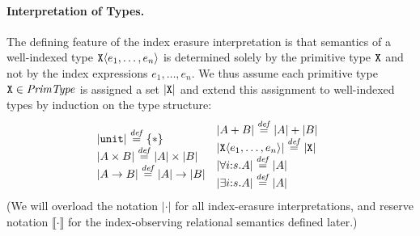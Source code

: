 
\paragraph{Interpretation of Types.}

The defining feature of the index erasure interpretation is that 
semantics of a well-indexed type $\textup{\texttt{X}}\langle e_1,\ldots,e_n \rangle$ is
determined solely by the primitive type $\textup{\texttt{X}}$ and not by the
index expressions $e_1,\ldots,e_n$. %
We thus assume each
primitive type $\textup{\texttt{X}} \in \mathit{PrimType}$ is assigned a set
$\left| \textup{\texttt{X}}\right|$ and %
extend this assignment to %
well-indexed types by induction on the type structure:
\begin{displaymath}
  \begin{array}{@{}c@{\hspace{0em}}c@{}}
    \begin{array}{@{}l}
      \tySem{\tyUnit} \isDefinedAs \{*\} \\
      \tySem{A \tyProduct B} \isDefinedAs \tySem{A} \times \tySem{B} \\
      \tySem{A \tyArr B} \isDefinedAs \tySem{A} \to \tySem{B} \\
    \end{array}
    &
    \begin{array}{l}
      \tySem{A + B} \isDefinedAs \tySem{A} + \tySem{B} \\
      \tySem{\tyPrim{X}{e_1,\ldots,e_n}} \isDefinedAs \tyPrimSem{\tyPrimNm{X}} \\
      \tySem{\forall i\mathord:s. A} \isDefinedAs \tySem{A} \\
      \tySem{\exists i\mathord:s. A} \isDefinedAs \tySem{A}
    \end{array}
  \end{array}
\end{displaymath}
(We will overload the
notation $\left|\cdot\right|$ for all index-erasure interpretations, 
and reserve notation $\llbracket\cdot\rrbracket$ for the
index-observing relational semantics defined later.)

